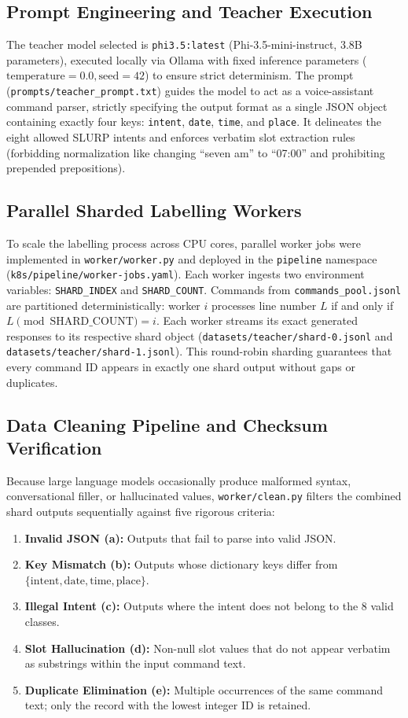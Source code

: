 \documentclass[10pt,a4paper]{article}
\begin{document}
\subsection{Prompt Engineering and Teacher Execution}
The teacher model selected is \texttt{phi3.5:latest} (Phi-3.5-mini-instruct, 3.8B parameters), executed locally via Ollama with fixed inference parameters ($\text{temperature} = 0.0, \text{seed} = 42$) to ensure strict determinism. The prompt (\texttt{prompts/teacher\_prompt.txt}) guides the model to act as a voice-assistant command parser, strictly specifying the output format as a single JSON object containing exactly four keys: \texttt{intent}, \texttt{date}, \texttt{time}, and \texttt{place}. It delineates the eight allowed SLURP intents and enforces verbatim slot extraction rules (forbidding normalization like changing ``seven am'' to ``07:00'' and prohibiting prepended prepositions).

\subsection{Parallel Sharded Labelling Workers}
To scale the labelling process across CPU cores, parallel worker jobs were implemented in \texttt{worker/worker.py} and deployed in the \texttt{pipeline} namespace (\texttt{k8s/pipeline/worker-jobs.yaml}). Each worker ingests two environment variables: \texttt{SHARD\_INDEX} and \texttt{SHARD\_COUNT}. Commands from \texttt{commands\_pool.jsonl} are partitioned deterministically: worker $i$ processes line number $L$ if and only if $L \pmod{\text{SHARD\_COUNT}} = i$. Each worker streams its exact generated responses to its respective shard object (\texttt{datasets/teacher/shard-0.jsonl} and \texttt{datasets/teacher/shard-1.jsonl}). This round-robin sharding guarantees that every command ID appears in exactly one shard output without gaps or duplicates.

\subsection{Data Cleaning Pipeline and Checksum Verification}
Because large language models occasionally produce malformed syntax, conversational filler, or hallucinated values, \texttt{worker/clean.py} filters the combined shard outputs sequentially against five rigorous criteria:
\begin{enumerate}
    \item \textbf{Invalid JSON (a):} Outputs that fail to parse into valid JSON.
    \item \textbf{Key Mismatch (b):} Outputs whose dictionary keys differ from $\{\text{intent}, \text{date}, \text{time}, \text{place}\}$.
    \item \textbf{Illegal Intent (c):} Outputs where the intent does not belong to the 8 valid classes.
    \item \textbf{Slot Hallucination (d):} Non-null slot values that do not appear verbatim as substrings within the input command text.
    \item \textbf{Duplicate Elimination (e):} Multiple occurrences of the same command text; only the record with the lowest integer ID is retained.
\end{enumerate}
\end{document}
